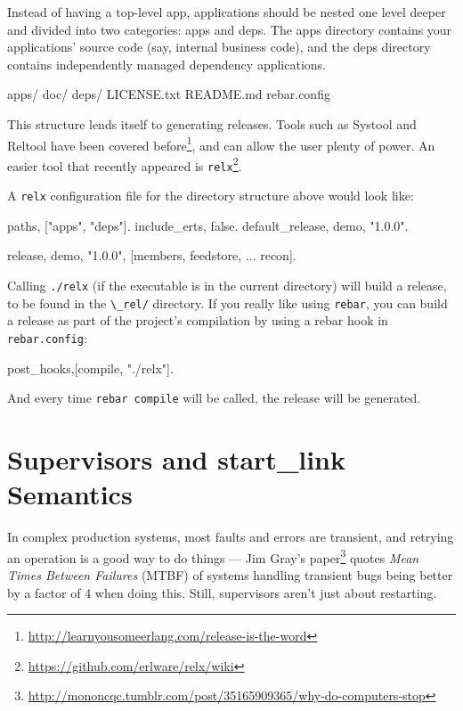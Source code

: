 \documentclass[11pt, oneside]{book}   	%
\newcommand{\filename}[1]{\Verb`#1`}
\newcommand{\app}[1]{\Verb`#1`}
\newcommand{\command}[1]{\Verb`#1`}
\begin{document}
Instead of having a top-level app, applications should be nested one level deeper and divided into two categories: apps and deps. The apps directory contains your applications' source code (say, internal business code), and the deps directory contains independently managed dependency applications.

\begin{VerbatimText}
apps/
doc/
deps/
LICENSE.txt
README.md
rebar.config
\end{VerbatimText}

This structure lends itself to generating releases. Tools such as Systool and Reltool have been covered before\footnote{\href{http://learnyousomeerlang.com/release-is-the-word}{http://learnyousomeerlang.com/release-is-the-word}}, and can allow the user plenty of power. An easier tool that recently appeared is \app{relx}\footnote{\href{https://github.com/erlware/relx/wiki}{https://github.com/erlware/relx/wiki}}.

A  \app{relx} configuration file for the directory structure above would look like:

\begin{VerbatimText}
{paths, ["apps", "deps"]}.
{include_erts, false}. %
{default_release, demo, "1.0.0"}.

{release, {demo, "1.0.0"},
    [members,
     feedstore,
     ...
     recon]}.
\end{VerbatimText}

Calling \command{./relx} (if the executable is in the current directory) will build a release, to be found in the \filename{\_rel/} directory. If you really like using \app{rebar}, you can build a release as part of the project's compilation by using a rebar hook in \filename{rebar.config}:

\begin{VerbatimText}
{post_hooks,[{compile, "./relx"}]}.
\end{VerbatimText}

And every time \command{rebar compile} will be called, the release will be generated.

\section{Supervisors and start\_link Semantics}
\label{sec:supervisors-and-start-link-semantics}

In complex production systems, most faults and errors are transient, and retrying an operation is a good way to do things — Jim Gray's paper\footnote{\href{http://mononcqc.tumblr.com/post/35165909365/why-do-computers-stop}{http://mononcqc.tumblr.com/post/35165909365/why-do-computers-stop}} quotes \emph{Mean Times Between Failures} (MTBF) of systems handling transient bugs being better by a factor of 4 when doing this. Still, supervisors aren't just about restarting.
\end{document}

